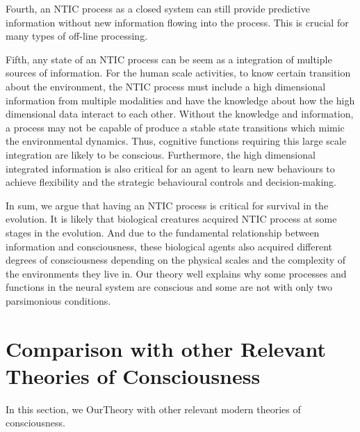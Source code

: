\documentclass[utf8]{article}
\begin{document}
	    Fourth, an NTIC process as a closed system can still provide predictive information without new information flowing into the process. This is crucial for many types of off-line processing. 
	    
	    Fifth, any state of an NTIC process can be seem as a integration of multiple sources of information. For the human scale activities, to know certain transition about the environment, the NTIC process must include a high dimensional information from multiple modalities and have the knowledge about how the high dimensional data interact to each other. Without the knowledge and information, a process may not be capable of produce a stable state transitions which mimic the environmental dynamics. Thus, cognitive functions requiring this large scale integration are likely to be conscious. Furthermore, the high dimensional integrated information is also critical for an agent to learn new behaviours to achieve flexibility and the strategic behavioural controls and decision-making. 
	    
	    In sum, we argue that having an NTIC process is critical for survival in the evolution. It is likely that biological creatures acquired NTIC process at some stages in the evolution. And due to the fundamental relationship between information and consciousness, these biological agents also acquired different degrees of consciousness depending on the physical scales and the complexity of the environments they live in. Our theory well explains why some processes and functions in the neural system are conscious and some are not with only two parsimonious conditions. 
	    


	\section{Comparison with other Relevant Theories of Consciousness}\label{sec:Comparison with other theories}
	In this section, we \ac{OurTheory} with other relevant modern theories of consciousness.
	
	
\end{document}
